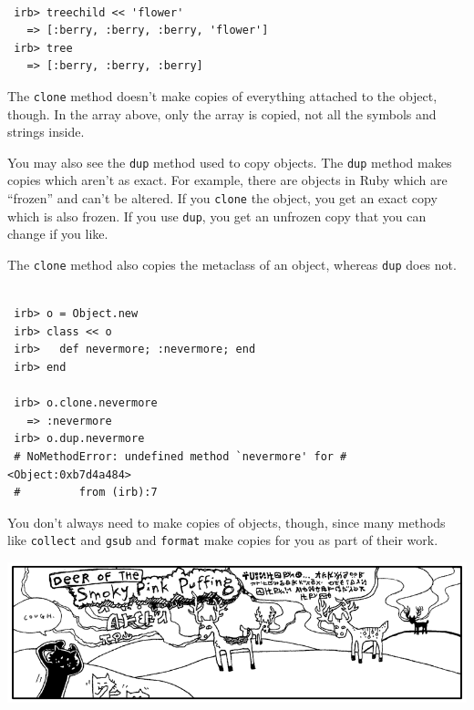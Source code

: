 \documentclass[10pt,twoside]{report}
\begin{document}
\begin{lstlisting}

 irb> treechild << 'flower'
   => [:berry, :berry, :berry, 'flower']
 irb> tree
   => [:berry, :berry, :berry]

\end{lstlisting}


The \lstinline[breaklines=true]|clone| method doesn't make copies of
everything attached to the object, though.  In the array above, only
the array is copied, not all the symbols and strings inside.

You may also see the \lstinline[breaklines=true]|dup| method used to
copy objects.  The \lstinline[breaklines=true]|dup| method makes
copies which aren't as exact.  For example, there are objects in Ruby
which are ``frozen'' and can't be altered.  If you
\lstinline[breaklines=true]|clone| the object, you get an exact copy
which is also frozen.  If you use \lstinline[breaklines=true]|dup|,
you get an unfrozen copy that you can change if you like.

The \lstinline[breaklines=true]|clone| method also copies the
metaclass of an object, whereas \lstinline[breaklines=true]|dup| does
not.


\begin{lstlisting}

 irb> o = Object.new
 irb> class << o
 irb>   def nevermore; :nevermore; end
 irb> end

 irb> o.clone.nevermore
   => :nevermore
 irb> o.dup.nevermore
 # NoMethodError: undefined method `nevermore' for #<Object:0xb7d4a484>
 #         from (irb):7

\end{lstlisting}



You don't always need to make copies of objects, though, since many
methods like \lstinline[breaklines=true]|collect| and
\lstinline[breaklines=true]|gsub| and
\lstinline[breaklines=true]|format| make copies for you as part of
their work.

	\includegraphics[width=1.0\textwidth]{cache/75.png}
\end{document}
